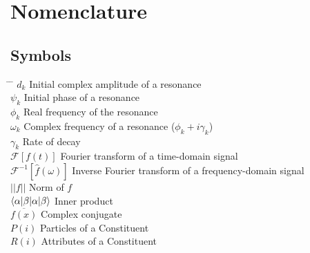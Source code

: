 \chapter*{Nomenclature}
\label{ch:nomenclature}


\section*{Symbols}
\begin{tabbing}
 \hspace*{1.6cm} \= \hspace*{8cm} \= \kill
 $d_k$ \> Initial complex amplitude of a resonance  \\[0.5ex]
 $\psi_k$ \> Initial phase of a resonance  \\[0.5ex]
 $\phi_k$ \> Real frequency of the resonance \\[0.5ex]
$\omega_k$ \> Complex frequency of a resonance ($\phi_k+ i\gamma_k$) \\[0.5ex]
$\gamma_k$ \> Rate of decay \\[0.5ex]
$\mathcal {F}[f(t)]$ \> Fourier transform of a time-domain signal  \\[0.5ex]
$\mathcal {F}^{-1}[\hat{f}(\omega)]$ \> Inverse Fourier transform of a frequency-domain signal  \\[0.5ex]

$|| f ||$ \> Norm of $f$  \\[0.5ex]
$\braket{\alpha | \beta}$ \> Inner product  \\[0.5ex]
$\overline{f(x)}$ \> Complex conjugate  \\[0.5ex]
$P(i)$ \> Particles of a Constituent  \\[0.5ex]
$R(i)$ \> Attributes of a Constituent  \\[0.5ex]

  
\end{tabbing}
